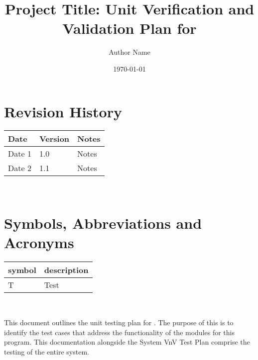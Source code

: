 \documentclass[12pt, titlepage]{article}
\begin{document}
\title{Project Title: Unit Verification and Validation Plan for \progname{}} 
\author{Author Name}
\date{\today}
	
\maketitle


\section{Revision History}

\begin{tabularx}{\textwidth}{p{3cm}p{2cm}X}
\toprule {\bf Date} & {\bf Version} & {\bf Notes}\\
\midrule
Date 1 & 1.0 & Notes\\
Date 2 & 1.1 & Notes\\
\bottomrule
\end{tabularx}

~\newpage

\tableofcontents

\listoftables


\listoffigures


\newpage

\section{Symbols, Abbreviations and Acronyms}

\renewcommand{\arraystretch}{1.2}
\begin{tabular}{l l} 
  \toprule		
  \textbf{symbol} & \textbf{description}\\
  \midrule 
  T & Test\\
  \bottomrule
\end{tabular}\\


\newpage


This document outlines the unit testing plan for \progname. The purpose of this 
is to identify the test cases that address the functionality of the modules for 
this program. This documentation alongside the System VnV Test Plan comprise 
the testing of the entire \progname system.
\end{document}
